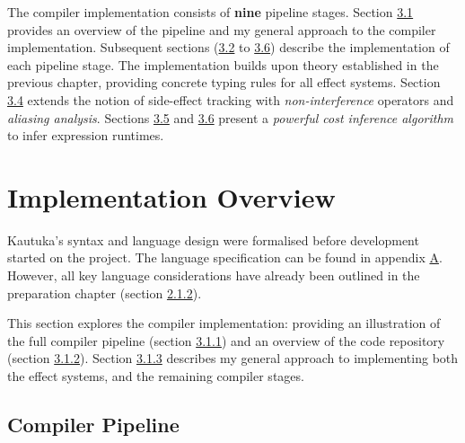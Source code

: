 \vspace{-1mm}


%
%

\label{sec:3}

The compiler implementation consists of \textbf{nine} pipeline stages. Section \hyperref[sec:3.1]{3.1} provides an overview of the pipeline and my general approach to the compiler implementation. Subsequent sections (\hyperref[sec:3.2]{3.2} to \hyperref[sec:3.6]{3.6}) describe the implementation of each pipeline stage. The implementation builds upon theory established in the previous chapter, providing concrete typing rules for all effect systems. Section \hyperref[sec:3.4]{3.4} extends the notion of side-effect tracking with \textit{non-interference} operators and \textit{aliasing analysis}. Sections \hyperref[sec:3.5]{3.5} and \hyperref[sec:3.6]{3.6} present a \textit{powerful cost inference algorithm} to infer expression runtimes.

\vspace{-2mm}

\section{Implementation Overview}

\label{sec:3.1}

\vspace{-1mm}

Kautuka's syntax and language design were formalised before development started on the project. The language specification can be found in appendix \hyperref[sec:A]{A}. However, all key language considerations have already been outlined in the preparation chapter (section \hyperref[sec:2.1.2]{2.1.2}).

This section explores the compiler implementation: providing an illustration of the full compiler pipeline (section \hyperref[sec:3.1.1]{3.1.1}) and an overview of the code repository (section \hyperref[sec:3.1.2]{3.1.2}). Section \hyperref[sec:3.1.3]{3.1.3} describes my general approach to implementing both the effect systems, and the remaining compiler stages.

\vspace{-3mm}

\subsection{Compiler Pipeline}

